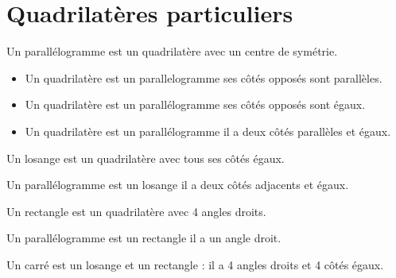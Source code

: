 \section{Quadrilatères particuliers}


{Un parallélogramme est un quadrilatère avec un centre de symétrie.}

{\begin{itemize}[leftmargin=0cm]
    \item Un quadrilatère est un parallelogramme \ssi ses côtés opposés  sont parallèles.
    \item Un quadrilatère est un parallélogramme \ssi ses côtés opposés sont égaux.
    \item Un quadrilatère est un parallélogramme \ssi il a deux côtés parallèles et égaux.
\end{itemize}}


{Un losange est un quadrilatère avec tous ses côtés égaux.}

{Un parallélogramme est un losange \ssi il a deux côtés adjacents et égaux.}


{Un rectangle est un quadrilatère avec 4 angles droits.}

{Un parallélogramme est un rectangle \ssi il a un angle droit.}


{Un carré est un losange et un rectangle : il a 4 angles droits et 4 côtés égaux.}

\begin{center}
\end{center}
